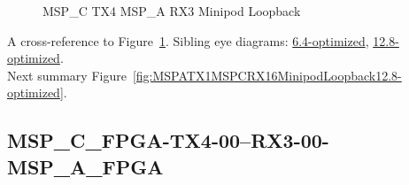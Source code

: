 \begin{figure}[h]
\begin{subfigure}{0.33\textwidth}
\hyperref[sec:MSPCFPGATX406RX306MSPAFPGA9.6-optimized]{}
\end{subfigure}\hspace*{\fill}
\begin{subfigure}{0.33\textwidth}
\hyperref[sec:MSPCFPGATX407RX307MSPAFPGA9.6-optimized]{}
\end{subfigure}\hspace*{\fill}
\begin{subfigure}{0.33\textwidth}
\hyperref[sec:MSPCFPGATX408RX308MSPAFPGA9.6-optimized]{}
\end{subfigure}

\begin{subfigure}{0.33\textwidth}
\hyperref[sec:MSPCFPGATX409RX309MSPAFPGA9.6-optimized]{}
\end{subfigure}\hspace*{\fill}
\begin{subfigure}{0.33\textwidth}
\hyperref[sec:MSPCFPGATX410RX310MSPAFPGA9.6-optimized]{}
\end{subfigure}\hspace*{\fill}
\begin{subfigure}{0.33\textwidth}
\hyperref[sec:MSPCFPGATX411RX311MSPAFPGA9.6-optimized]{}
\end{subfigure}

\caption{MSP\_C TX4 MSP\_A RX3 Minipod Loopback} \label{fig:MSPCTX4MSPARX3MinipodLoopback9.6-optimized}
\end{figure}

A cross-reference to Figure~\ref{fig:MSPCTX4MSPARX3MinipodLoopback9.6-optimized}.
Sibling eye diagrams: \hyperref[sec:MSPCTX4MSPARX3MinipodLoopback6.4-optimized]{6.4-optimized}, \hyperref[sec:MSPCTX4MSPARX3MinipodLoopback12.8-optimized]{12.8-optimized}. \\
Next summary Figure~\ref{fig:MSPATX1MSPCRX16MinipodLoopback12.8-optimized}.
\clearpage
% 
\subsection{MSP\_C\_FPGA-TX4-00--RX3-00-MSP\_A\_FPGA}\label{sec:MSPCFPGATX400RX300MSPAFPGA9.6-optimized}

